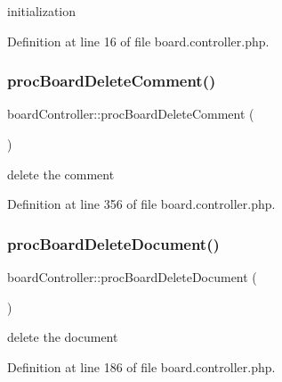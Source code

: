 initialization 



Definition at line 16 of file board.\+controller.\+php.

\hypertarget{classboardController_af5cfe27b152d9806acf0ced54299b0ea}{}\label{classboardController_af5cfe27b152d9806acf0ced54299b0ea} 
\subsubsection{\texorpdfstring{proc\+Board\+Delete\+Comment()}{procBoardDeleteComment()}}
{\footnotesize\ttfamily board\+Controller\+::proc\+Board\+Delete\+Comment (\begin{DoxyParamCaption}{ }\end{DoxyParamCaption})}



delete the comment 



Definition at line 356 of file board.\+controller.\+php.

\hypertarget{classboardController_a3e67502fb41d52a0425f40906029576b}{}\label{classboardController_a3e67502fb41d52a0425f40906029576b} 
\subsubsection{\texorpdfstring{proc\+Board\+Delete\+Document()}{procBoardDeleteDocument()}}
{\footnotesize\ttfamily board\+Controller\+::proc\+Board\+Delete\+Document (\begin{DoxyParamCaption}{ }\end{DoxyParamCaption})}



delete the document 



Definition at line 186 of file board.\+controller.\+php.

\hypertarget{classboardController_a8a71a5c163777a169a3e843c2f6dafae}{}\label{classboardController_a8a71a5c163777a169a3e843c2f6dafae} 
